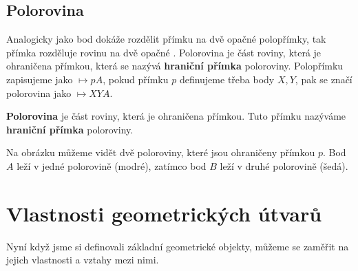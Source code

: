 \documentclass[12pt,a4paper]{article}
\begin{document}
\subsection{Polorovina}
Analogicky jako bod dokáže rozdělit přímku na dvě opačné polopřímky, tak přímka
rozděluje rovinu na dvě opačné . 
Polorovina je část roviny, která je ohraničena přímkou, která se nazývá \textbf{hraniční přímka} poloroviny.
Polopřímku zapisujeme jako $\mapsto pA$, pokud přímku $p$ definujeme třeba body $X,Y$, pak se značí polorovina jako $\mapsto XYA$.

\begin{definitionbox}
    \textbf{Polorovina} je část roviny,
    která je ohraničena přímkou.
    Tuto přímku nazýváme \textbf{hraniční přímka} poloroviny.
\end{definitionbox}


\begin{center}
\end{center}
Na obrázku můžeme vidět dvě poloroviny, které jsou ohraničeny přímkou $p$.
Bod $A$ leží v jedné polorovině (modré), zatímco bod $B$ leží v druhé polorovině (šedá).


\section{Vlastnosti geometrických útvarů}
Nyní když jsme si definovali základní geometrické objekty, můžeme se zaměřit na jejich vlastnosti a vztahy mezi nimi.
\end{document}
